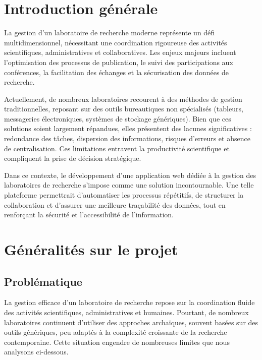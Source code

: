 \documentclass{rapportPfe}
\begin{document}
\newpage
\chapter*{Introduction générale}

La gestion d’un laboratoire de recherche moderne représente un défi multidimensionnel, nécessitant une coordination rigoureuse des activités scientifiques, administratives et collaboratives. Les enjeux majeurs incluent l’optimisation des processus de publication, le suivi des participations aux conférences, la facilitation des échanges et la sécurisation des données de recherche.

Actuellement, de nombreux laboratoires recourent à des méthodes de gestion traditionnelles, reposant sur des outils bureautiques non spécialisés (tableurs, messageries électroniques, systèmes de stockage génériques). Bien que ces solutions soient largement répandues, elles présentent des lacunes significatives : redondance des tâches, dispersion des informations, risques d’erreurs et absence de centralisation. Ces limitations entravent la productivité scientifique et compliquent la prise de décision stratégique.

Dans ce contexte, le développement d’une application web dédiée à la gestion des laboratoires de recherche s’impose comme une solution incontournable. Une telle plateforme permettrait d’automatiser les processus répétitifs, de structurer la collaboration et d’assurer une meilleure traçabilité des données, tout en renforçant la sécurité et l’accessibilité de l’information.

\newpage
\tabledematieres

\newpage
\listoffigures


\chapter{Généralités sur le projet}

\section{Problématique}

La gestion efficace d’un laboratoire de recherche repose sur la coordination fluide des activités scientifiques, administratives et humaines. Pourtant, de nombreux laboratoires continuent d’utiliser des approches archaïques, souvent basées sur des outils génériques, peu adaptés à la complexité croissante de la recherche contemporaine. Cette situation engendre de nombreuses limites que nous analysons ci-dessous.
\end{document}
